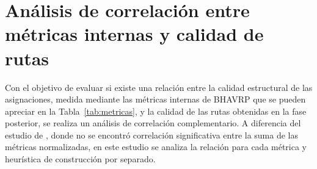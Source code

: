 \section{An\'alisis de correlaci\'on entre m\'etricas internas y calidad de rutas}

Con el objetivo de evaluar si existe una relaci\'on entre la calidad estructural de las asignaciones, medida mediante las m\'etricas internas de BHAVRP que se pueden apreciar en la Tabla~\ref{tab:metricas}, y la calidad de las rutas obtenidas en la fase posterior, se realiza un an\'alisis de correlaci\'on complementario. A diferencia del estudio de \parencite{ericramosaragonIncorporacionModuloMetricas2025}, donde no se encontr\'o correlaci\'on significativa entre la suma de las métricas normalizadas, en este estudio se analiza la relaci\'on para cada métrica y heur\'istica de construcci\'on por separado. 

